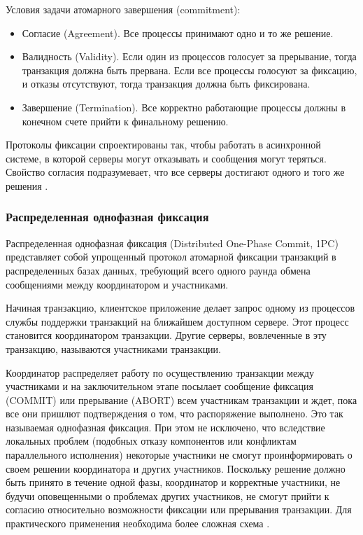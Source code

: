 Условия задачи атомарного завершения (commitment):

\begin{itemize}
    \item Согласие (Agreement). Все процессы принимают одно и то же решение.
    \item Валидность (Validity). Если один из процессов голосует за прерывание, тогда транзакция должна быть прервана. 
    Если все процессы голосуют за фиксацию, и отказы отсутствуют, тогда транзакция должна быть фиксирована.
    \item Завершение (Termination). Все корректно работающие процессы должны в конечном счете прийти к финальному 
    решению.
\end{itemize}

Протоколы фиксации спроектированы так, чтобы работать в асинхронной системе, в которой серверы могут отказывать и сообщения 
могут теряться. Свойство согласия подразумевает, что все серверы достигают одного и того же решения \autocite{Fix}.

\subsubsection{Распределенная однофазная фиксация}

Распределенная однофазная фиксация (Distributed One-Phase Commit, 1PC) представляет собой упрощенный протокол 
атомарной фиксации транзакций в распределенных базах данных, требующий всего одного раунда обмена сообщениями 
между координатором и участниками.

Начиная транзакцию, клиентское приложение делает запрос одному из процессов службы поддержки транзакций на ближайшем 
доступном сервере. Этот процесс становится координатором транзакции. Другие серверы, вовлеченные в эту транзакцию,
называются участниками транзакции.

Координатор распределяет работу по осуществлению транзакции между участниками и на заключительном этапе посылает 
сообщение фиксация (COMMIT) или прерывание (ABORT) всем участникам транзакции и ждет, пока все они пришлют подтверждения 
о том, что распоряжение выполнено. Это так называемая однофазная фиксация. При этом не исключено, что вследствие локальных 
проблем (подобных отказу компонентов или конфликтам параллельного исполнения) некоторые участники не смогут проинформировать
 о своем решении координатора и других участников. Поскольку решение должно быть принято в течение одной фазы, координатор и 
 корректные участники, не будучи оповещенными о проблемах других участников, не смогут прийти к согласию относительно возможности
фиксации или прерывания транзакции. Для практического применения необходима более сложная схема \autocite{Fix}.

